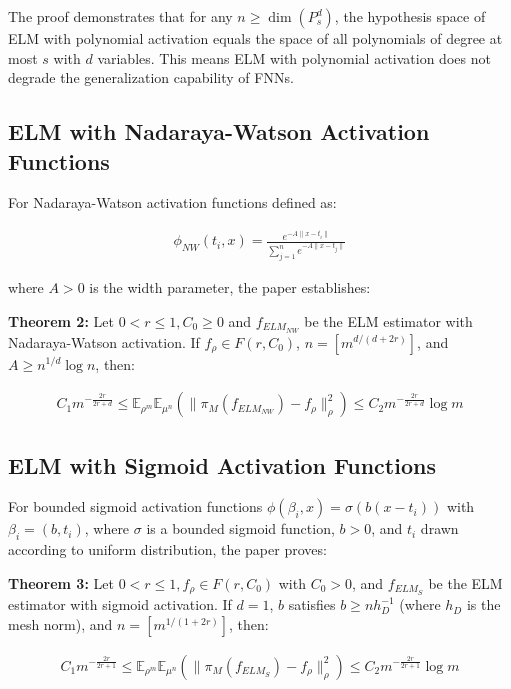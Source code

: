 \documentclass[11pt]{article}
\begin{document}
The proof demonstrates that for any $n \geq \dim(P_s^d)$, the hypothesis space of ELM with polynomial activation equals the space of all polynomials of degree at most $s$ with $d$ variables. This means ELM with polynomial activation does not degrade the generalization capability of FNNs.

\subsection{ELM with Nadaraya-Watson Activation Functions}

For Nadaraya-Watson activation functions defined as:

\begin{align}
\phi_{NW}(t_i, x) = \frac{e^{-A \|x - t_i\|}}{\sum_{j=1}^n e^{-A \|x - t_j\|}}
\end{align}

where $A > 0$ is the width parameter, the paper establishes:

\textbf{Theorem 2:} Let $0 < r \leq 1, C_0 \geq 0$ and $f_{ELM_{NW}}$ be the ELM estimator with Nadaraya-Watson activation. If $f_\rho \in F(r, C_0)$, $n = [m^{d/(d+2r)}]$, and $A \geq n^{1/d} \log n$, then:

\begin{align}
C_1 m^{-\frac{2r}{2r+d}} \leq \mathbb{E}_{\rho^m}\mathbb{E}_{\mu^n} \left( \|\pi_M(f_{ELM_{NW}}) - f_\rho\|_\rho^2 \right) \leq C_2 m^{-\frac{2r}{2r+d}} \log m
\end{align}

\subsection{ELM with Sigmoid Activation Functions}

For bounded sigmoid activation functions $\phi(\beta_i, x) = \sigma(b(x - t_i))$ with $\beta_i = (b, t_i)$, where $\sigma$ is a bounded sigmoid function, $b > 0$, and $t_i$ drawn according to uniform distribution, the paper proves:

\textbf{Theorem 3:} Let $0 < r \leq 1, f_\rho \in F(r, C_0)$ with $C_0 > 0$, and $f_{ELM_S}$ be the ELM estimator with sigmoid activation. If $d = 1$, $b$ satisfies $b \geq n h_D^{-1}$ (where $h_D$ is the mesh norm), and $n = [m^{1/(1+2r)}]$, then:

\begin{align}
C_1 m^{-\frac{2r}{2r+1}} \leq \mathbb{E}_{\rho^m}\mathbb{E}_{\mu^n} \left( \|\pi_M(f_{ELM_S}) - f_\rho\|_\rho^2 \right) \leq C_2 m^{-\frac{2r}{2r+1}} \log m
\end{align}
\end{document}
